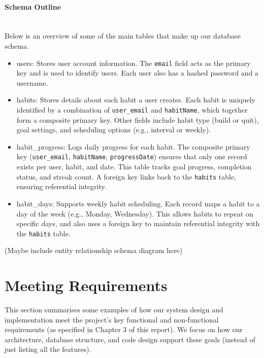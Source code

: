 \paragraph{Schema Outline}\mbox{}\\
Below is an overview of some of the main tables that make up our database schema.
\begin{itemize}

  \item {users}: Stores user account information. The \texttt{email} field acts as the primary key and is used to identify users. Each user also has a hashed password and a username.

  \item {habits}: Stores details about each habit a user creates. Each habit is uniquely identified by a combination of \texttt{user\_email} and \texttt{habitName}, which together form a composite primary key. Other fields include habit type (build or quit), goal settings, and scheduling options (e.g., interval or weekly).

  \item {habit\_progress}: Logs daily progress for each habit. The composite primary key (\texttt{user\_email}, \texttt{habitName}, \texttt{progressDate}) ensures that only one record exists per user, habit, and date. This table tracks goal progress, completion status, and streak count. A foreign key links back to the \texttt{habits} table, ensuring referential integrity.

\item {habit\_days}: Supports weekly habit scheduling. Each record maps a habit to a day of the week (e.g., Monday, Wednesday). This allows habits to repeat on specific days, and also uses a foreign key to maintain referential integrity with the \texttt{habits} table.

\end{itemize}

(Maybe include entity relationship schema diagram here)

\section{Meeting Requirements}

This section summarises some examples of how our system design and implementation meet the project's key functional and non-functional requirements (as specified in Chapter 3 of this report). We focus on how our architecture, database structure, and code design support these goals (instead of just listing all the features).

